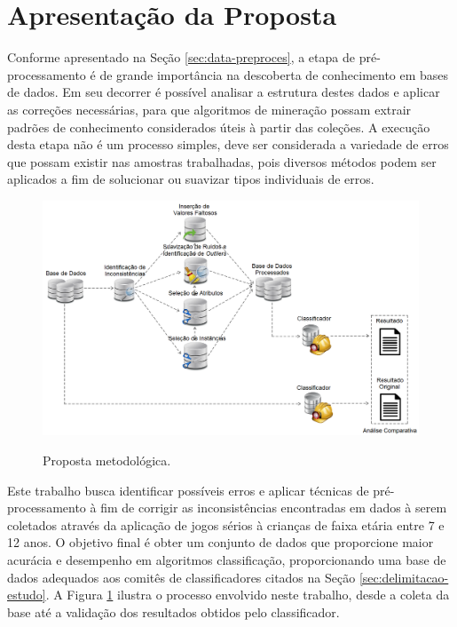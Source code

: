 \section{Apresentação da Proposta}
\label{sec:apresentacao-proposta}

Conforme apresentado na Seção \ref{sec:data-preproces}, a etapa de pré\hyp{}processamento é de grande importância na descoberta de conhecimento em bases de dados. Em seu decorrer é possível analisar a estrutura destes dados e aplicar as correções necessárias, para que algoritmos de mineração possam extrair padrões de conhecimento considerados úteis à partir das coleções. A execução desta etapa não é um processo simples, deve ser considerada a variedade de erros que possam existir nas amostras trabalhadas, pois diversos métodos podem ser aplicados a fim de solucionar ou suavizar tipos individuais de erros.

\begin{figure}[H]
    \centering
    \caption{Proposta metodológica.}
    \includegraphics[width=\linewidth]{figuras/modelo-proposta.png}
    \label{fig:proposta-metodologica}
\end{figure}

Este trabalho busca identificar possíveis erros e aplicar técnicas de pré\hyp{}processamento à fim de corrigir as inconsistências encontradas em dados à serem coletados através da aplicação de jogos sérios à crianças de faixa etária entre 7 e 12 anos. O objetivo final é obter um conjunto de dados que proporcione maior acurácia e desempenho em algoritmos classificação, proporcionando uma base de dados adequados aos comitês de classificadores citados na Seção \ref{sec:delimitacao-estudo}. A Figura \ref{fig:proposta-metodologica} ilustra o processo envolvido neste trabalho, desde a coleta da base até a validação dos resultados obtidos pelo classificador.